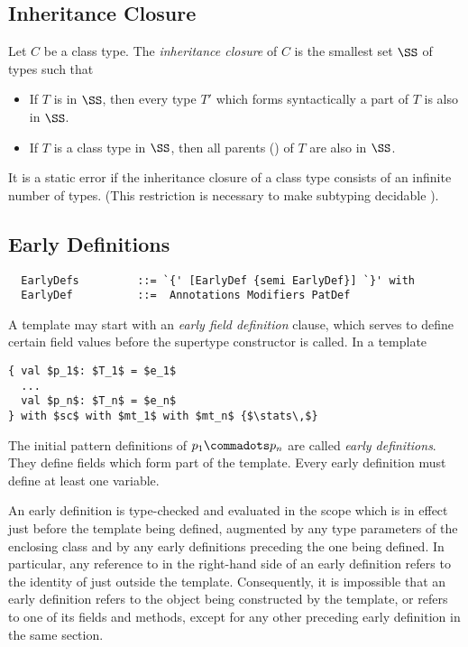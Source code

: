 \subsection{Inheritance Closure}\label{sec:inheritance-closure}

Let $C$ be a class type. The {\em inheritance closure} of $C$ is the
smallest set $\SS$ of types such that
\begin{itemize}
\item
If $T$ is in $\SS$, then every type $T'$ which forms syntactically
a part of $T$ is also in $\SS$.
\item
If $T$ is a class type in $\SS$, then all parents ()
of $T$ are also in $\SS$.
\end{itemize}
It is a static error if the inheritance closure of a class type
consists of an infinite number of types. (This restriction is
necessary to make subtyping decidable
\cite{kennedy-pierce:decidable}).

\subsection{Early Definitions}\label{sec:early-defs}

\syntax\begin{lstlisting}
  EarlyDefs         ::= `{' [EarlyDef {semi EarlyDef}] `}' with
  EarlyDef          ::=  Annotations Modifiers PatDef  
\end{lstlisting}

A template may start with an {\em early field definition} clause,
which serves to define certain field values before the supertype
constructor is called. In a template
\begin{lstlisting}
{ val $p_1$: $T_1$ = $e_1$
  ...
  val $p_n$: $T_n$ = $e_n$
} with $sc$ with $mt_1$ with $mt_n$ {$\stats\,$}
\end{lstlisting}
The initial pattern definitions of $p_1 \commadots p_n$ are called
{\em early definitions}. They define fields 
which form part of the template. Every early definition must define
at least one variable. 

An early definition is type-checked and evaluated in the scope which
is in effect just before the template being defined, augmented by any
type parameters of the enclosing class and by any early definitions
preceding the one being defined. In particular, any reference to
\lstinline@this@ in the right-hand side of an early definition refers
to the identity of \lstinline@this@ just outside the template. Consequently, it
is impossible that an early definition refers to the object being
constructed by the template, or refers to one of its fields and
methods, except for any other preceding early definition in the same
section.

